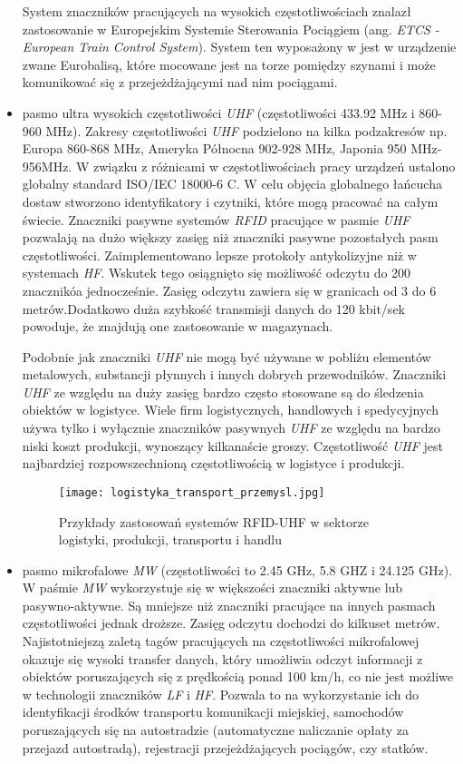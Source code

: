 \begin{itemize}
	 System znaczników pracujących na wysokich częstotliwościach znalazł zastosowanie w Europejskim Systemie Sterowania Pociągiem (ang. \emph{ETCS - European Train Control System}). System ten wyposażony w jest w urządzenie zwane Eurobalisą, które mocowane jest na torze pomiędzy szynami i może komunikować się z przejeżdżającymi nad nim pociągami.

	\item pasmo ultra wysokich częstotliwości \emph{UHF} (częstotliwości 433.92 MHz i 860-960 MHz).
Zakresy częstotliwości \emph{UHF} podzielono na kilka podzakresów np. Europa 860-868 MHz, Ameryka Północna 902-928 MHz, Japonia  950 MHz-956MHz. W związku z różnicami w częstotliwościach pracy urządzeń ustalono globalny standard ISO/IEC 18000-6 C. W celu objęcia globalnego łańcucha dostaw stworzono identyfikatory i czytniki, które mogą pracować na całym świecie. Znaczniki pasywne systemów \emph{RFID} pracujące w pasmie \emph{UHF} pozwalają na dużo większy zasięg niż znaczniki pasywne pozostałych pasm częstotliwości. Zaimplementowano lepsze protokoły antykolizyjne niż w systemach \emph{HF}. Wskutek tego osiągnięto się możliwość odczytu do 200 znacznikóa jednocześnie. Zasięg odczytu zawiera się w granicach od 3 do 6 metrów.Dodatkowo duża szybkość transmisji danych do 120 kbit/sek powoduje, że znajdują one zastosowanie w magazynach.

Podobnie jak znaczniki \emph{UHF} nie mogą być używane w pobliżu elementów metalowych, substancji płynnych i innych dobrych przewodników. 
Znaczniki \emph{UHF} ze względu na duży zasięg bardzo często stosowane są do śledzenia obiektów w logistyce. Wiele firm logistycznych, handlowych i spedycyjnych używa tylko i wyłącznie znaczników pasywnych \emph{UHF} ze względu na bardzo niski koszt produkcji, wynoszący kilkanaście groszy. 
Częstotliwość \emph{UHF} jest najbardziej rozpowszechnioną częstotliwością w logistyce i produkcji.

	\begin{figure}[h!]
	\centering
	    \texttt{[image: logistyka\_transport\_przemysl.jpg]}
	    \caption{Przykłady zastosowań systemów RFID-UHF w sektorze logistyki, produkcji, transportu i handlu}
	\end{figure}

	\item pasmo mikrofalowe \emph{MW} (częstotliwości to 2.45 GHz, 5.8 GHZ i 24.125 GHz).
W paśmie \emph{MW} wykorzystuje się w większości znaczniki aktywne lub pasywno-aktywne. Są  mniejsze niż znaczniki pracujące na innych pasmach częstotliwości jednak droższe. Zasięg odczytu dochodzi do kilkuset metrów. Najistotniejszą zaletą tagów pracujących na częstotliwości mikrofalowej okazuje się wysoki transfer danych, który  umożliwia odczyt informacji z obiektów poruszających się z prędkością ponad 100 km/h, co nie jest możliwe w technologii znaczników \emph{LF} i \emph{HF}. Pozwala to na wykorzystanie ich do identyfikacji środków transportu komunikacji miejskiej, samochodów poruszających się  na autostradzie (automatyczne naliczanie opłaty za przejazd autostradą), rejestracji przejeżdżających pociągów, czy statków.


\end{itemize}
